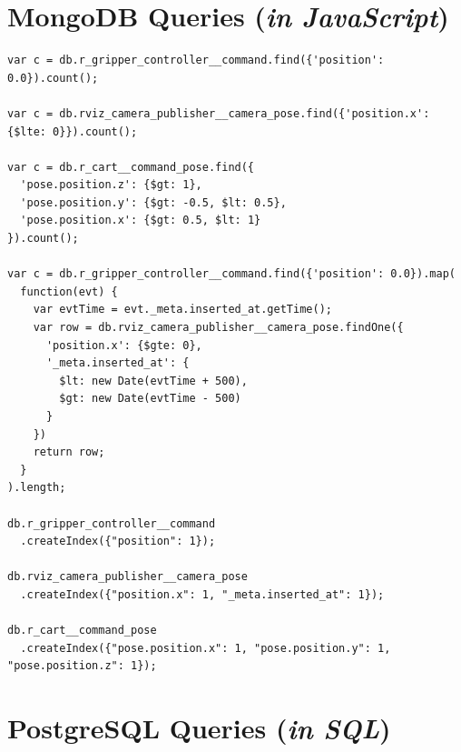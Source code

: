 \documentclass[nocopyrightspace]{acm_proc_article-sp}
\begin{document}

  

\clearpage

\onecolumn

\appendix
\vspace{0.5cm}

\section{MongoDB Queries (\textit{in JavaScript})}
\vspace{0.5cm}
\begin{lstlisting}[style=htmlcssjs]
var c = db.r_gripper_controller__command.find({'position': 0.0}).count();

var c = db.rviz_camera_publisher__camera_pose.find({'position.x': {$lte: 0}}).count();

var c = db.r_cart__command_pose.find({
  'pose.position.z': {$gt: 1},
  'pose.position.y': {$gt: -0.5, $lt: 0.5},
  'pose.position.x': {$gt: 0.5, $lt: 1}
}).count();

var c = db.r_gripper_controller__command.find({'position': 0.0}).map(
  function(evt) {
    var evtTime = evt._meta.inserted_at.getTime();
    var row = db.rviz_camera_publisher__camera_pose.findOne({
      'position.x': {$gte: 0},
      '_meta.inserted_at': {
        $lt: new Date(evtTime + 500),
        $gt: new Date(evtTime - 500)
      }
    })
    return row;
  }
).length;

db.r_gripper_controller__command
  .createIndex({"position": 1});
  
db.rviz_camera_publisher__camera_pose
  .createIndex({"position.x": 1, "_meta.inserted_at": 1});
  
db.r_cart__command_pose
  .createIndex({"pose.position.x": 1, "pose.position.y": 1, "pose.position.z": 1});
\end{lstlisting}


\section{PostgreSQL Queries (\textit{in SQL})}
\vspace{0.5cm}
\end{document}
